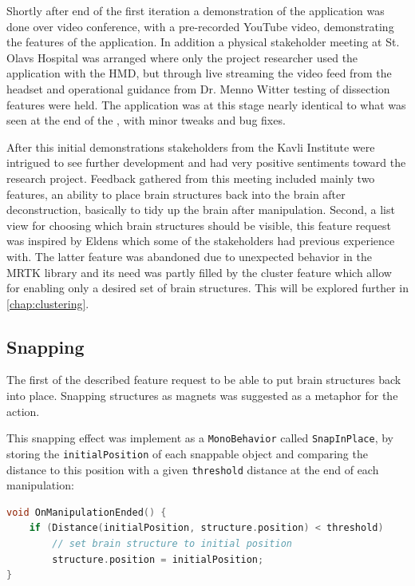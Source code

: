 Shortly after end of the first iteration a demonstration of the application was done over video conference, with a pre-recorded YouTube video, demonstrating the features of the application. In addition a physical stakeholder meeting at St. Olavs Hospital was arranged where only the project researcher used the application with the HMD, but through live streaming the video feed from the headset and operational guidance from Dr. Menno Witter testing of dissection features were held. The application was at this stage nearly identical to what was seen at the end of the , with minor tweaks and bug fixes.

After this initial demonstrations stakeholders from the Kavli Institute were intrigued to see further development and had very positive sentiments toward the research project. Feedback gathered from this meeting included mainly two features, an ability to place brain structures back into the brain after deconstruction, basically to tidy up the brain after manipulation. Second, a list view for choosing which brain structures should be visible, this feature request was inspired by Eldens  which some of the stakeholders had previous experience with. The latter feature was abandoned due to unexpected behavior in the MRTK library and its need was partly filled by the cluster feature which allow for enabling only a desired set of brain structures. This will be explored further in \autoref{chap:clustering}.

\subsection{Snapping}
The first of the described feature request to be able to put brain structures back into place. Snapping structures as magnets was suggested as a metaphor for the action. 

This snapping effect was implement as a \texttt{MonoBehavior} called \texttt{SnapInPlace}, by storing the \texttt{initialPosition} of each snappable object and comparing the distance to this position with a given \texttt{threshold} distance at the end of each manipulation: 

\begin{lstlisting}[language=c]
void OnManipulationEnded() {
    if (Distance(initialPosition, structure.position) < threshold) 
        // set brain structure to initial position 
        structure.position = initialPosition; 
}
\end{lstlisting}

